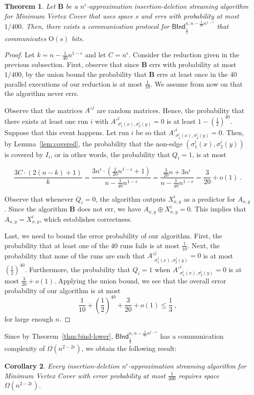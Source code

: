 \documentclass[10pt,a4paper]{article}
\newtheorem{theorem}{Theorem}
\newtheorem{corollary}[theorem]{Corollary}
\newcommand{\Order}{\mathrm O}
\begin{document}
\begin{theorem} \label{thm:vc-reduction}
 Let $\mathbf{B}$ be a $n^{\epsilon}$-approximation 
 insertion-deletion streaming algorithm for \textsf{Minimum Vertex Cover} that uses space $s$ and errs with probability 
 at most $1/400$. Then, there exists a communication protocol for $\textsf{BInd}^{n,n - \frac{1}{20}n^{1-\epsilon}}_{\frac{1}{3}}$ 
 that communicates $\Order(s)$ bits.
\end{theorem}

\begin{proof}
Let $k = n - \frac{1}{40} n^{1-\epsilon}$ and let $C= n^{\epsilon}$.
 Consider the reduction given in the previous subsection. First, observe that since $\mathbf{B}$ errs with probability
 at most $1/400$, by the union bound the probability that $\mathbf{B}$ errs at least once in the $40$ parallel executions of our
 reduction is at most $\frac{1}{10}$. We assume from now on that the algorithm never errs.
 
 Observe that the matrices $A'^j$ are random matrices. Hence, 
%
%
 the probability that there exists at least one run $i$ with $A'^i_{\sigma^i_1(x), \sigma^i_2(y)} = 0$ is at least 
 $1 - (\frac{1}{2})^{40}$. Suppose that this event happens. Let run $i$ be so that $A'^i_{\sigma^i_1(x), \sigma^i_2(y)} = 0$.
 Then, by Lemma~\ref{lem:covered}, the probability that the non-edge $(\sigma^i_1(x), \sigma^i_2(y))$ is covered by $I_i$,
 or in other words, the probability that $Q_i = 1$, is at most 
 
 $$\frac{3 C \cdot (2(n-k) + 1)}{k} = \frac{3n^{\epsilon} \cdot (\frac{1}{20} n^{1-\epsilon} + 1) }{n - \frac{1}{40}n^{1-\epsilon}} = 
 \frac{\frac{3}{20}n + 3n^{\epsilon}}{n - \frac{1}{40}n^{1-\epsilon}} = \frac{3}{20} + o(1) \ . $$  
 
 Observe that whenever $Q_i = 0$, the algorithm outputs $X^i_{x,y}$ as a predictor for $A_{x,y}$. Since the algorithm $\mathbf{B}$ 
 does not err, we have $A_{x,y} \oplus X^i_{x,y} = 0$. This implies that $A_{x,y} = X^i_{x,y}$, which establishes correctness.
 
 Last, we need to bound the error probability of our algorithm. First, the probability that at least one of the $40$ runs 
 fails is at most $\frac{1}{10}$. Next, the probability that none of the runs are such that $A'^j_{\sigma^j_1(x), \sigma^j_2(y)} = 0$
 is at most $(\frac{1}{2})^{40}$. Furthermore, the probability that $Q_i = 1$ when $A'^i_{\sigma^i_1(x), \sigma^i_2(y)} = 0$ is at 
 most $\frac{3}{20} + o(1)$. Applying the union bound, we see that the overall error probability of our algorithm is at most
 $$\frac{1}{10}+ (\frac{1}{2})^{40} + \frac{3}{20} + o(1) \le \frac{1}{3} \ , $$
 for large enough $n$. 
\end{proof}
Since by Theorem~\ref{thm:bind-lower}, $\textsf{BInd}^{n,n - \frac{1}{40}n^{1-\epsilon}}_{\frac{1}{3}}$ has a 
communication complexity of $\Omega(n^{2-2\epsilon})$, we
obtain the following result:
\begin{corollary}
 Every insertion-deletion $n^\epsilon$-approximation streaming algorithm for \textsf{Minimum Vertex Cover} with error probability 
 at most $\frac{1}{400}$ requires space $\Omega(n^{2-2\epsilon})$.
\end{corollary}
\end{document}
